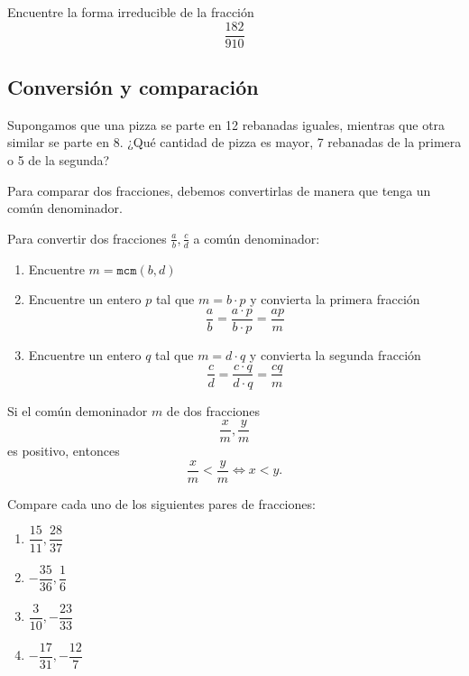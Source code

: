 	\begin{problema}
		Encuentre la forma irreducible de la fracci\'on $$\dfrac{182}{910}$$
	\end{problema}
	



\subsection{Conversi\'on y comparaci\'on}


	Supongamos que una pizza se parte en 12 rebanadas iguales, mientras que otra similar se parte en 8. ¿Qu\'e cantidad de pizza es mayor, 7 rebanadas de la primera o 5 de la segunda?



	Para comparar dos fracciones, debemos convertirlas de manera que tenga un común denominador. 



	\begin{alg}
		Para convertir dos fracciones $\frac{a}{b}, \frac{c}{d}$ a común denominador:
		\begin{enumerate}
			\item Encuentre $m=\texttt{mcm}(b,d)$
			\item Encuentre un entero $p$ tal que $m=b\cdot p$ y convierta la primera fracci\'on
			$$
			\dfrac{a}{b}=\dfrac{a\cdot p}{b \cdot p}=\dfrac{ap}{m}
			$$
			\item Encuentre un entero $q$ tal que $m=d\cdot q$ y convierta la segunda fracci\'on
			$$
			\dfrac{c}{d}=\dfrac{c\cdot q}{d \cdot q}=\dfrac{cq}{m}
			$$
		\end{enumerate}
		
	\end{alg}
	



	\begin{rem}
		Si el común demoninador $m$ de dos fracciones $$\dfrac{x}{m}, \dfrac{y}{m}$$ es positivo, entonces
		$$
		\dfrac{x}{m} < \frac{y}{m} \iff x < y.
		$$
	\end{rem}
	




	\begin{problema}
		Compare cada uno de los siguientes pares de fracciones:
		\begin{enumerate}
			\item $\dfrac{15}{11}, \dfrac{28}{37}$ 
			\item $-\dfrac{35}{36}, \dfrac{1}{6}$
			\item $\dfrac{3}{10}, -\dfrac{23}{33}$
			\item $-\dfrac{17}{31}, -\dfrac{12}{7}$
		\end{enumerate}
		
	\end{problema}


